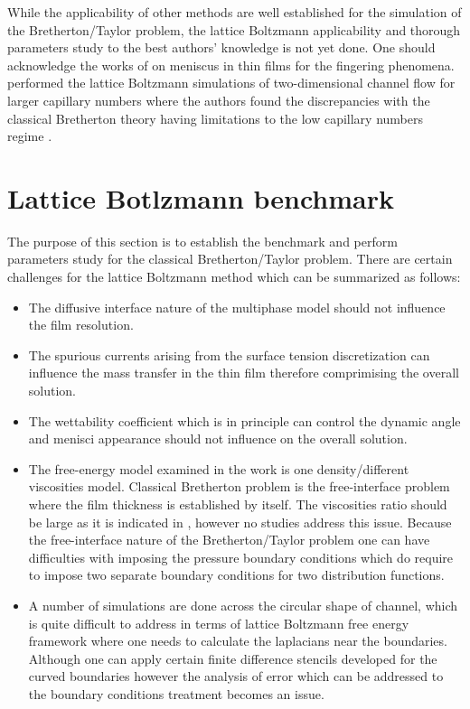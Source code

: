 \documentclass{article}
\begin{document}
While the applicability of other methods are well established for the
simulation of the Bretherton/Taylor problem, the lattice Boltzmann
applicability and thorough parameters study to the best authors' knowledge is
not yet done. One should acknowledge the works of
\citet{pagonabarraga-fingers} on meniscus in thin films for the fingering
phenomena. \citet{sehgal-microchannel} performed the lattice Boltzmann
simulations of two-dimensional channel flow for larger capillary numbers where
the authors found the discrepancies with the classical Bretherton theory having
limitations to the low capillary numbers regime \cite{giavedoni-numerical}. 

\section{Lattice Botlzmann benchmark}
The purpose of this section is to establish the benchmark and perform
parameters study for the classical Bretherton/Taylor problem. There are certain
challenges for the lattice Boltzmann method which can be summarized as follows:
\begin{itemize}
 \item The diffusive interface nature of the multiphase model should not
influence the film resolution.
 \item The spurious currents arising from the surface tension discretization
can influence the mass transfer in the thin film therefore comprimising the
overall solution.
 \item The wettability coefficient which is in principle can control the
dynamic angle and menisci appearance \cite{pagonabarraga-finger} should not
influence on the overall solution.
 \item The free-energy model examined in the work is one density/different
viscosities model. Classical Bretherton problem is the free-interface problem
where the film thickness is established by itself. The viscosities ratio should
be large as it is indicated in \cite{pagonabarraga-fingers}, however no studies
address this issue. Because the free-interface nature of the Bretherton/Taylor
problem one can have difficulties with imposing the pressure boundary
conditions which do require to impose two separate boundary conditions for two
distribution functions.
 \item A number of simulations are done across the circular shape of channel,
which is quite difficult to address in terms of lattice Boltzmann free energy
framework where one needs to calculate the laplacians near the boundaries.
Although one can apply certain finite difference stencils
\cite{arnold-boundary,hunt-boundary} developed for the curved boundaries
however the analysis of error which can be addressed to the boundary conditions
treatment becomes an issue. 
\end{itemize}
\end{document}
